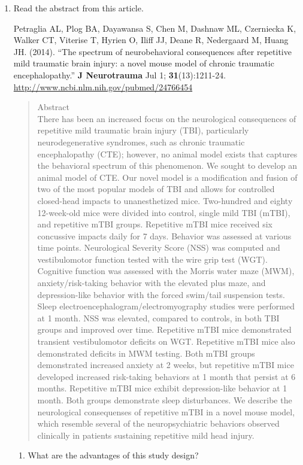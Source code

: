\begin{enumerate}
\item   Read the abstract from this  article.

Petraglia AL, Plog BA, Dayawansa S, Chen M, Dashnaw ML, Czerniecka K,
Walker CT, Viterise T, Hyrien O, Iliff JJ, Deane R, Nedergaard M,
Huang JH. (2014). ``The spectrum of neurobehavioral consequences after repetitive mild traumatic brain injury: a novel mouse model of chronic traumatic encephalopathy.''
{\bf J Neurotrauma} Jul 1; {\bf 31}(13):1211-24. 
\url{http://www.ncbi.nlm.nih.gov/pubmed/24766454}
{\footnotesize
\begin{quotation}
Abstract\\
There has been an increased focus on the neurological consequences of
repetitive mild traumatic brain injury (TBI), particularly
neurodegenerative syndromes, such as chronic traumatic encephalopathy
(CTE); however, no animal model exists that captures the behavioral
spectrum of this phenomenon. We sought to develop an animal model of
CTE. Our novel model is a modification and fusion of two of the most
popular models of TBI and allows for controlled closed-head impacts to
unanesthetized mice. Two-hundred and eighty 12-week-old mice were
divided into control, single mild TBI (mTBI), and repetitive mTBI
groups. Repetitive mTBI mice received six concussive impacts daily for
7 days. Behavior was assessed at various time points. Neurological
Severity Score (NSS) was computed and vestibulomotor function tested
with the wire grip test (WGT). Cognitive function was assessed with
the Morris water maze (MWM), anxiety/risk-taking behavior with the
elevated plus maze, and depression-like behavior with the forced
swim/tail suspension tests. Sleep
electroencephalogram/electromyography studies were performed at 1
month. NSS was elevated, compared to controls, in both TBI groups and
improved over time. Repetitive mTBI mice demonstrated transient
vestibulomotor deficits on WGT. Repetitive mTBI mice also demonstrated
deficits in MWM testing. Both mTBI groups demonstrated increased
anxiety at 2 weeks, but repetitive mTBI mice developed increased
risk-taking behaviors at 1 month that persist at 6 months. Repetitive
mTBI mice exhibit depression-like behavior at 1 month. Both groups
demonstrate sleep disturbances. We describe the neurological consequenses
of repetitive mTBI in a novel mouse model, which resemble several of
the neuropsychiatric behaviors observed clinically in patients
sustaining repetitive mild head injury.
\end{quotation}
}
\begin{enumerate}
\item  What are the advantages of this study design?
\begin{students}
 \vfill
\end{students}


\end{enumerate}
\end{enumerate}
